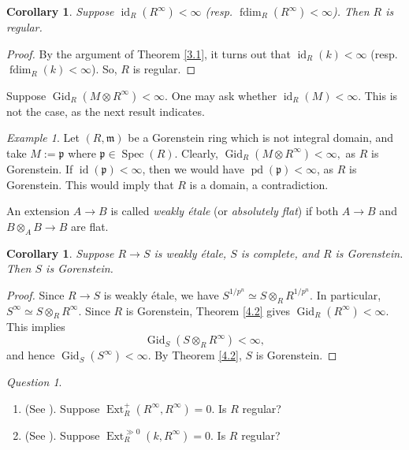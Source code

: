 \documentclass[11pt,a4paper]{amsart}
\numberwithin{equation}{section}
\newtheorem{corollary}[theorem]{Corollary}
\theoremstyle{definition}
\theoremstyle{remark}
\newtheorem{example}[theorem]{Example}
\newtheorem{question}[theorem]{Question}\newtheorem{discussion}[theorem]{Discussion}
\newcommand{\fm}{\mathfrak{m}}
\begin{document}
\begin{corollary}\label{4.3}
	Suppose 
	\(
	\operatorname{id}_R(R^\infty) < \infty 	\) (resp. 	\(
	\operatorname{fdim}_R(R^\infty) < \infty
	\)).
Then \(R\) is regular.
\end{corollary}

\begin{proof}
By the argument of Theorem \ref{3.1}, it turns out that   
\(
\operatorname{id}_R(k) < \infty	\) (resp. 	\(
\operatorname{fdim}_R(k) < \infty
\)). 
So, \(R\) is regular.
\end{proof}

Suppose
$
\operatorname{Gid}_R(M \otimes R^\infty) < \infty.
$
One may ask whether \(\operatorname{id}_R(M) < \infty\). This is not the case, as the next result indicates. 

\begin{example}
Let $(R,\fm)$ be a  Gorenstein ring which is not  integral domain, and take \(M := \mathfrak p\) where \(\mathfrak p \in \operatorname{Spec}(R)\). Clearly,
	\(
	\operatorname{Gid}_R(M \otimes R^\infty) < \infty,
	\) as $R$ is  Gorenstein.
	If \(\operatorname{id}(\mathfrak p) < \infty\), then we would have \(\operatorname{pd}(\mathfrak p) < \infty\), as \(R\) is Gorenstein. This would imply that \(R\) is a domain, a contradiction.
\end{example}

An extension \(A \to B\) is called \emph{weakly \'etale} (or \emph{absolutely flat}) if both \(A \to B\) and \(B \otimes_A B \to B\) are flat.

\begin{corollary}\label{4.4}
	Suppose \(R \to S\) is weakly \'etale, \(S\) is complete, and \(R\) is Gorenstein. Then \(S\) is Gorenstein.
\end{corollary}

\begin{proof}
	Since \(R \to S\) is weakly \'etale, we have \(S^{1/p^n} \simeq S \otimes_R R^{1/p^n}\). In particular,
	\(
	S^\infty \simeq S \otimes_R R^\infty.
	\)
	Since \(R\) is Gorenstein, Theorem \ref{4.2} gives \(\operatorname{Gid}_R(R^\infty) < \infty\). This implies
	\[
	\operatorname{Gid}_S(S \otimes_R R^\infty) < \infty,
	\]
	and hence \(\operatorname{Gid}_S(S^\infty) < \infty\). By Theorem \ref{4.2}, \(S\) is Gorenstein.
\end{proof}

\begin{question}
	\begin{enumerate}
		\item[1)] (See \cite{Ryo}).	Suppose \(
		\operatorname{Ext}^{+}_{R}(R^\infty,R^\infty)=0\).
		Is 	$R$ regular?
		
		\item[2)](See \cite[Conjecture 5.19]{Elham}). Suppose \(
		\operatorname{Ext}^{\gg 0}_{R}(k,R^\infty)=0\).
		Is 	$R$ regular? 
		
	\end{enumerate}
\end{question}
\end{document}
